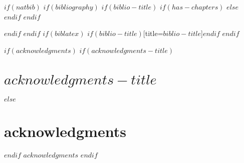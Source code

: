 \documentclass[
$if(fontsize)$
  $fontsize$,
$endif$
$if(lang)$
  $babel-lang$,
$endif$
$if(papersize)$
  $papersize$paper,
$endif$
$if(twoside)$
twoside,
$endif$
$if(openright)$
openright,
$endif$
$if(title)$
titlepage,
$endif$
numbers=noenddot,
headinclude,
footinclude,
cleardoublepage=empty,
abstract=on,
BCOR=5mm,
dvipsnames,
$for(classoption)$
  $classoption$$sep$,
$endfor$
]{scrreport}
\begin{document}
$if(natbib)$
$if(bibliography)$
$if(biblio-title)$
$if(has-chapters)$
\renewcommand\bibname{$biblio-title$}
$else$
\renewcommand\refname{$biblio-title$}
$endif$
$endif$
  

$endif$
$endif$
$if(biblatex)$
\printbibliography$if(biblio-title)$[title=$biblio-title$]$endif$
$endif$

$if(acknowledgments)$
$if(acknowledgments-title)$
\chapter*{$acknowledgments-title$}
$else$
\chapter*{acknowledgments}
$endif$
$acknowledgments$
$endif$
\end{document}
